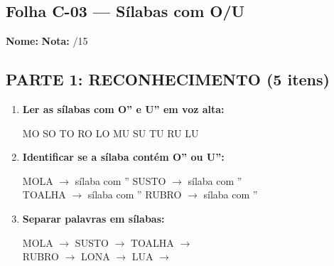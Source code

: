 \subsection{Folha C-03 --- Sílabas com O/U}

\begin{exercicio}

\noindent\textbf{Nome:} \underline{\hspace{4cm}} \quad \textbf{Nota:} \underline{\hspace{1cm}}/15

\subsection*{PARTE 1: RECONHECIMENTO (5 itens)}

\begin{enumerate}
  \item \textbf{Ler as sílabas com O'' e U'' em voz alta:}
  \begin{center}
  MO \quad SO \quad TO \quad RO \quad LO \quad MU \quad SU \quad TU \quad RU \quad LU
  \end{center}

  \item \textbf{Identificar se a sílaba contém O'' ou U'':}
  \begin{center}
  MOLA $\rightarrow$ sílaba com \underline{\hspace{1cm}}'' \quad SUSTO $\rightarrow$ sílaba com \underline{\hspace{1cm}}'' \\
  TOALHA $\rightarrow$ sílaba com \underline{\hspace{1cm}}'' \quad RUBRO $\rightarrow$ sílaba com \underline{\hspace{1cm}}''
  \end{center}

  \item \textbf{Separar palavras em sílabas:}
  \begin{center}
  MOLA $\rightarrow$ \underline{\hspace{1.5cm}} \quad SUSTO $\rightarrow$ \underline{\hspace{1.5cm}} \quad TOALHA $\rightarrow$ \underline{\hspace{1.5cm}} \\
  RUBRO $\rightarrow$ \underline{\hspace{1.5cm}} \quad LONA $\rightarrow$ \underline{\hspace{1.5cm}} \quad LUA $\rightarrow$ \underline{\hspace{1.5cm}}
  \end{center}


\end{enumerate}
\end{exercicio}
